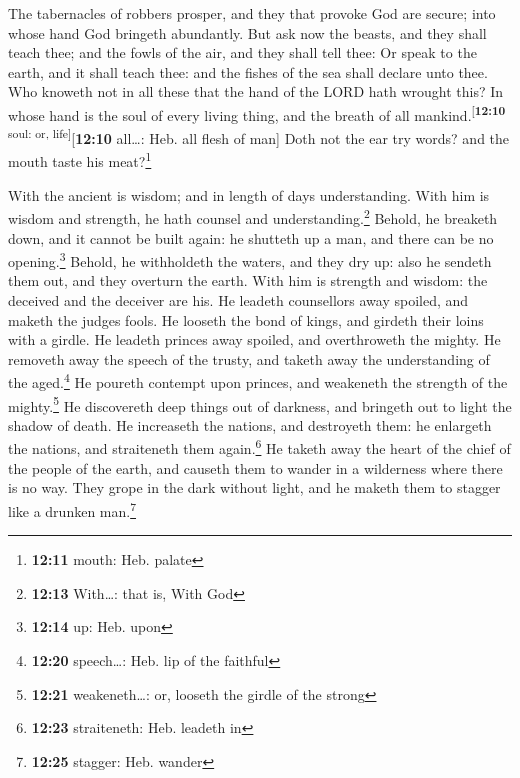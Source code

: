  The tabernacles of robbers prosper, and they that provoke
God are secure; into whose hand God bringeth abundantly. 
But ask now the beasts, and they shall teach thee; and the fowls of the
air, and they shall tell thee:  Or speak to the earth, and
it shall teach thee: and the fishes of the sea shall declare unto thee.
 Who knoweth not in all these that the hand of the LORD
hath wrought this?  In whose hand is the soul of every
living thing, and the breath of all
mankind.\textsuperscript{{[}\textbf{12:10} soul: or,
life{]}}{[}\textbf{12:10} all\ldots: Heb. all flesh of man{]}
 Doth not the ear try words? and the mouth taste his
meat?\footnote{\textbf{12:11} mouth: Heb. palate}

 With the ancient is wisdom; and in length of days
understanding.  With him is wisdom and strength, he hath
counsel and understanding.\footnote{\textbf{12:13} With\ldots: that is,
  With God}  Behold, he breaketh down, and it cannot be
built again: he shutteth up a man, and there can be no
opening.\footnote{\textbf{12:14} up: Heb. upon}  Behold,
he withholdeth the waters, and they dry up: also he sendeth them out,
and they overturn the earth.  With him is strength and
wisdom: the deceived and the deceiver are his.  He
leadeth counsellors away spoiled, and maketh the judges fools.
 He looseth the bond of kings, and girdeth their loins
with a girdle.  He leadeth princes away spoiled, and
overthroweth the mighty.  He removeth away the speech of
the trusty, and taketh away the understanding of the aged.\footnote{\textbf{12:20}
  speech\ldots: Heb. lip of the faithful}  He poureth
contempt upon princes, and weakeneth the strength of the
mighty.\footnote{\textbf{12:21} weakeneth\ldots: or, looseth the girdle
  of the strong}  He discovereth deep things out of
darkness, and bringeth out to light the shadow of death. 
He increaseth the nations, and destroyeth them: he enlargeth the
nations, and straiteneth them again.\footnote{\textbf{12:23}
  straiteneth: Heb. leadeth in}  He taketh away the heart
of the chief of the people of the earth, and causeth them to wander in a
wilderness where there is no way.  They grope in the dark
without light, and he maketh them to stagger like a drunken
man.\footnote{\textbf{12:25} stagger: Heb. wander}


